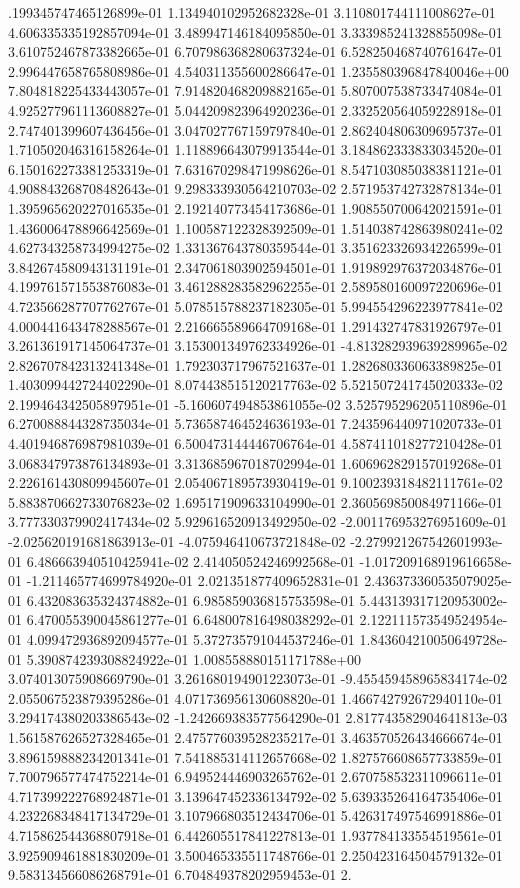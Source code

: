 .199345747465126899e-01	1.134940102952682328e-01	3.110801744111008627e-01	4.606335335192857094e-01	3.489947146184095850e-01	3.333985241328855098e-01	3.610752467873382665e-01	6.707986368280637324e-01	6.528250468740761647e-01	2.996447658765808986e-01	4.540311355600286647e-01	1.235580396847840046e+00	7.804818225433443057e-01	7.914820468209882165e-01	5.807007538733474084e-01	4.925277961113608827e-01	5.044209823964920236e-01	2.332520564059228918e-01	2.747401399607436456e-01	3.047027767159797840e-01	2.862404806309695737e-01	1.710502046316158264e-01	1.118896643079913544e-01	3.184862333833034520e-01	6.150162273381253319e-01	7.631670298471998626e-01	8.547103085038381121e-01	4.908843268708482643e-01	9.298333930564210703e-02	2.571953742732878134e-01	1.395965620227016535e-01	2.192140773454173686e-01	1.908550700642021591e-01	1.436006478896642569e-01	1.100587122328392509e-01	1.514038742863980241e-02	4.627343258734994275e-02	1.331367643780359544e-01	3.351623326934226599e-01	3.842674580943131191e-01	2.347061803902594501e-01	1.919892976372034876e-01	4.199761571553876083e-01	3.461288283582962255e-01	2.589580160097220696e-01	4.723566287707762767e-01	5.078515788237182305e-01	5.994554296223977841e-02	4.000441643478288567e-01	2.216665589664709168e-01	1.291432747831926797e-01	3.261361917145064737e-01	3.153001349762334926e-01	-4.813282939639289965e-02	2.826707842313241348e-01	1.792303717967521637e-01	1.282680336063389825e-01	1.403099442724402290e-01	8.074438515120217763e-02	5.521507241745020333e-02	2.199464342505897951e-01	-5.160607494853861055e-02	3.525795296205110896e-01	6.270088844328735034e-01	5.736587464524636193e-01	7.243596440971020733e-01	4.401946876987981039e-01	6.500473144446706764e-01	4.587411018277210428e-01	3.068347973876134893e-01	3.313685967018702994e-01	1.606962829157019268e-01	2.226161430809945607e-01	2.054067189573930419e-01	9.100239318482111761e-02	5.883870662733076823e-02	1.695171909633104990e-01	2.360569850084971166e-01	3.777330379902417434e-02	5.929616520913492950e-02	-2.001176953276951609e-01	-2.025620191681863913e-01	-4.075946410673721848e-02	-2.279921267542601993e-01	6.486663940510425941e-02	2.414050524246992568e-01	-1.017209168919616658e-01	-1.211465774699784920e-01	2.021351877409652831e-01	2.436373360535079025e-01	6.432083635324374882e-01	6.985859036815753598e-01	5.443139317120953002e-01	6.470055390045861277e-01	6.648007816498038292e-01	2.122111573549524954e-01	4.099472936892094577e-01	5.372735791044537246e-01	1.843604210050649728e-01	5.390874239308824922e-01	1.008558880151171788e+00	3.074013075908669790e-01	3.261680194901223073e-01	-9.455459458965834174e-02	2.055067523879395286e-01	4.071736956130608820e-01	1.466742792672940110e-01	3.294174380203386543e-02	-1.242669383577564290e-01	2.817743582904641813e-03	1.561587626527328465e-01	2.475776039528235217e-01	3.463570526434666674e-01	3.896159888234201341e-01	7.541885314112657668e-02	1.827576608657733859e-01	7.700796577474752214e-01	6.949524446903265762e-01	2.670758532311096611e-01	4.717399222768924871e-01	3.139647452336134792e-02	5.639335264164735406e-01	4.232268348417134729e-01	3.107966803512434706e-01	5.426317497546991886e-01	4.715862544368807918e-01	6.442605517841227813e-01	1.937784133554519561e-01	3.925909461881830209e-01	3.500465335511748766e-01	2.250423164504579132e-01	9.583134566086268791e-01	6.704849378202959453e-01	2.